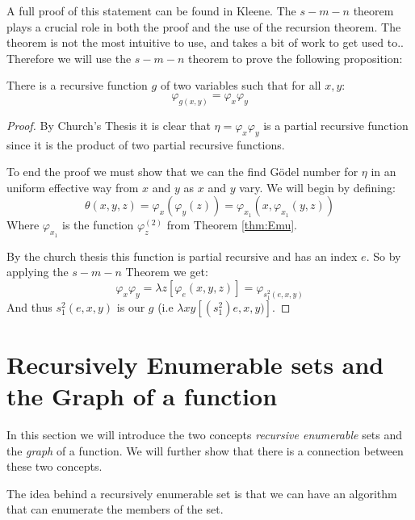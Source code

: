 \documentclass[../main.tex]{subfiles}
\begin{document}
A full proof of this statement can be found in Kleene. The $s-m-n$ theorem
plays a crucial role in both the proof and the use of the recursion theorem.
The theorem is not the most intuitive to use, and takes a bit of work to get
used to.. Therefore we will use the $s-m-n$ theorem to
prove the following proposition:
\begin{prop}
	There is a recursive function $g$ of two variables such that for all
	$x,y$:
\[\varphi_{g(x,y)}=\varphi_x\varphi_y\]
\end{prop}
\begin{proof}
	By Church's Thesis it is clear that $\eta=\varphi_x\varphi_y$ is a
	partial recursive function since it is the product of two partial
	recursive functions.

	To end the proof we must show that we can the find Gödel number for $\eta$
	in an uniform effective way from $x$ and $y$ as $x$ and $y$ vary. We
	will begin by defining:
	\[\theta(x,y,z)=\varphi_x(\varphi_y(z))=\varphi_{x_1}(x,\varphi_{x_1}(y,z))\]
	Where $\varphi_{x_1}$ is the function $\varphi_z^{(2)}$ from Theorem
	\ref{thm:Emu}.

	By the church thesis this function is partial recursive
	and has an index $e$. So by applying the $s-m-n$ Theorem we get:
	\[\varphi_x\varphi_y=\lambda
	z[\varphi_e(x,y,z)]=\varphi_{s_1^2(e,x,y)}\]
	And thus $s_1^2(e,x,y)$ is our $g$ (i.e $\lambda xy[(s_1^2)e,x,y)]$.
\end{proof}

\section{Recursively Enumerable sets and the Graph of a function}
In this section we will introduce the two concepts \textit{recursive
enumerable} sets and the \textit{graph} of a function. We will further show
that there is a connection between these two concepts.

The idea behind a recursively enumerable set is that we can have an algorithm
that can enumerate the members of the set.
\end{document}
